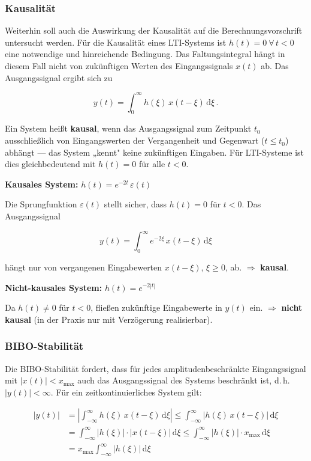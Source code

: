 \subsubsection*{Kausalität}

Weiterhin soll auch die Auswirkung der Kausalität auf die Berechnungsvorschrift untersucht werden. Für die Kausalität eines LTI-Systems ist $h(t) = 0\ \forall\, t < 0$ eine notwendige und hinreichende Bedingung. Das Faltungsintegral hängt in diesem Fall nicht von zukünftigen Werten des Eingangssignals $x(t)$ ab. Das Ausgangssignal ergibt sich zu

$$
y(t) = \int_0^{\infty} h(\xi)\,x(t - \xi)\,\mathrm{d}\xi\,.
$$

\begin{beispiel}[Kausalität]
Ein System heißt \textbf{kausal}, wenn das Ausgangssignal zum Zeitpunkt $t_0$ ausschließlich von Eingangswerten der Vergangenheit und Gegenwart ($t \leq t_0$) abhängt — das System „kennt" keine zukünftigen Eingaben. Für LTI-Systeme ist dies gleichbedeutend mit $h(t) = 0$ für alle $t < 0$.

\textbf{Kausales System:} $h(t) = e^{-2t}\,\varepsilon(t)$

Die Sprungfunktion $\varepsilon(t)$ stellt sicher, dass $h(t) = 0$ für $t < 0$. Das Ausgangssignal

$$
y(t) = \int_0^{\infty} e^{-2\xi}\,x(t - \xi)\,\mathrm{d}\xi
$$

hängt nur von vergangenen Eingabewerten $x(t - \xi)$, $\xi \geq 0$, ab. $\Rightarrow$ \textbf{kausal}.

\textbf{Nicht-kausales System:} $h(t) = e^{-2|t|}$

Da $h(t) \neq 0$ für $t < 0$, fließen zukünftige Eingabewerte in $y(t)$ ein. $\Rightarrow$ \textbf{nicht kausal} (in der Praxis nur mit Verzögerung realisierbar).
\end{beispiel}

\subsubsection*{BIBO-Stabilität}

Die BIBO-Stabilität fordert, dass für jedes amplitudenbeschränkte Eingangssignal mit $|x(t)| < x_{\max}$ auch das Ausgangssignal des Systems beschränkt ist, d.\,h.\ $|y(t)| < \infty$. Für ein zeitkontinuierliches System gilt:

\begin{align*}
|y(t)| &= \left|\int_{-\infty}^{\infty} h(\xi)\,x(t - \xi)\,\mathrm{d}\xi\right|
\leq \int_{-\infty}^{\infty} |h(\xi)\,x(t - \xi)|\,\mathrm{d}\xi \\
&= \int_{-\infty}^{\infty} |h(\xi)|\cdot|x(t - \xi)|\,\mathrm{d}\xi
\leq \int_{-\infty}^{\infty} |h(\xi)|\cdot x_{\max}\,\mathrm{d}\xi \\
&= x_{\max}\int_{-\infty}^{\infty} |h(\xi)|\,\mathrm{d}\xi
\end{align*}

